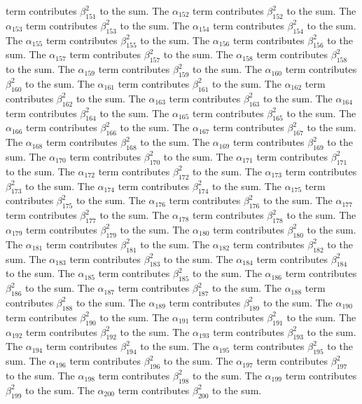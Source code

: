 \begin{lemma}
term contributes $\beta_{151}^{2}$ to the sum. The $\alpha_{152}$ term contributes $\beta_{152}^{2}$ to the sum. The $\alpha_{153}$ term contributes $\beta_{153}^{2}$ to the sum. The $\alpha_{154}$ term contributes $\beta_{154}^{2}$ to the sum. The $\alpha_{155}$ term contributes $\beta_{155}^{2}$ to the sum. The $\alpha_{156}$ term contributes $\beta_{156}^{2}$ to the sum. The $\alpha_{157}$ term contributes $\beta_{157}^{2}$ to the sum. The $\alpha_{158}$ term contributes $\beta_{158}^{2}$ to the sum. The $\alpha_{159}$ term contributes $\beta_{159}^{2}$ to the sum. The $\alpha_{160}$ term contributes $\beta_{160}^{2}$ to the sum. The $\alpha_{161}$ term contributes $\beta_{161}^{2}$ to the sum. The $\alpha_{162}$ term contributes $\beta_{162}^{2}$ to the sum. The $\alpha_{163}$ term contributes $\beta_{163}^{2}$ to the sum. The $\alpha_{164}$ term contributes $\beta_{164}^{2}$ to the sum. The $\alpha_{165}$ term contributes $\beta_{165}^{2}$ to the sum. The $\alpha_{166}$ term contributes $\beta_{166}^{2}$ to the sum. The $\alpha_{167}$ term contributes $\beta_{167}^{2}$ to the sum. The $\alpha_{168}$ term contributes $\beta_{168}^{2}$ to the sum. The $\alpha_{169}$ term contributes $\beta_{169}^{2}$ to the sum. The $\alpha_{170}$ term contributes $\beta_{170}^{2}$ to the sum. The $\alpha_{171}$ term contributes $\beta_{171}^{2}$ to the sum. The $\alpha_{172}$ term contributes $\beta_{172}^{2}$ to the sum. The $\alpha_{173}$ term contributes $\beta_{173}^{2}$ to the sum. The $\alpha_{174}$ term contributes $\beta_{174}^{2}$ to the sum. The $\alpha_{175}$ term contributes $\beta_{175}^{2}$ to the sum. The $\alpha_{176}$ term contributes $\beta_{176}^{2}$ to the sum. The $\alpha_{177}$ term contributes $\beta_{177}^{2}$ to the sum. The $\alpha_{178}$ term contributes $\beta_{178}^{2}$ to the sum. The $\alpha_{179}$ term contributes $\beta_{179}^{2}$ to the sum. The $\alpha_{180}$ term contributes $\beta_{180}^{2}$ to the sum. The $\alpha_{181}$ term contributes $\beta_{181}^{2}$ to the sum. The $\alpha_{182}$ term contributes $\beta_{182}^{2}$ to the sum. The $\alpha_{183}$ term contributes $\beta_{183}^{2}$ to the sum. The $\alpha_{184}$ term contributes $\beta_{184}^{2}$ to the sum. The $\alpha_{185}$ term contributes $\beta_{185}^{2}$ to the sum. The $\alpha_{186}$ term contributes $\beta_{186}^{2}$ to the sum. The $\alpha_{187}$ term contributes $\beta_{187}^{2}$ to the sum. The $\alpha_{188}$ term contributes $\beta_{188}^{2}$ to the sum. The $\alpha_{189}$ term contributes $\beta_{189}^{2}$ to the sum. The $\alpha_{190}$ term contributes $\beta_{190}^{2}$ to the sum. The $\alpha_{191}$ term contributes $\beta_{191}^{2}$ to the sum. The $\alpha_{192}$ term contributes $\beta_{192}^{2}$ to the sum. The $\alpha_{193}$ term contributes $\beta_{193}^{2}$ to the sum. The $\alpha_{194}$ term contributes $\beta_{194}^{2}$ to the sum. The $\alpha_{195}$ term contributes $\beta_{195}^{2}$ to the sum. The $\alpha_{196}$ term contributes $\beta_{196}^{2}$ to the sum. The $\alpha_{197}$ term contributes $\beta_{197}^{2}$ to the sum. The $\alpha_{198}$ term contributes $\beta_{198}^{2}$ to the sum. The $\alpha_{199}$ term contributes $\beta_{199}^{2}$ to the sum. The $\alpha_{200}$ term contributes $\beta_{200}^{2}$ to the sum. 
\end{lemma}

